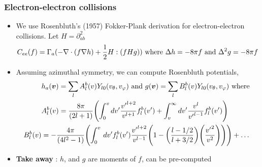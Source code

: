 \documentclass[mathserif, aspectratio=169]{beamer}
\newcommand{\vect}[1]{\boldsymbol{#1}}
\newcommand{\of}[1]{\mleft( #1 \mright)}
\newcommand{\diff}[1]{\, d#1}
\newcommand{\vtheta}{{v_{\theta}}}
\newcommand{\vphi}{v_{\varphi}}
\begin{document}
\begin{frame}
	\frametitle{Electron-electron collisions}
	\begin{itemize}
		\item We use Rosenbluth's (1957) Fokker-Plank derivation for electron-electron collisions. Let $H=\partial^2_{ab}$
		\begin{align}
			C_{ee}(f) &= \Gamma_a(-\nabla \cdot (f \nabla h ) + \frac{1}{2} H : \of{f H g}) \text{ where } \Delta h  = -8\pi f \text{ and } \Delta^2 g =-8\pi f	
		\end{align}
		\item Assuming azimuthal symmetry, we can compute Rosenbluth potentials, 
		\begin{align}
			& h_a\of{\vect{v}} = \sum_{l} A^{b}_l\of{v} Y_{l0}\of{\vtheta, \vphi}  \text{ and } g\of{\vect{v}} = \sum_{l} B^{b}_l\of{v} Y_{l0}\of{\vtheta, \vphi}\text{ where } \\
			\tiny
			& A^{b}_l\of{v} = \frac{8\pi}{(2l+1)}\of{\int_{0}^{v} dv^\prime \frac{{v^\prime}^{l+2}}{v^{l+1}} f^{b}_l\of{v^\prime} +  \int_{v}^{\infty} dv^\prime \frac{{v}^{l}}{{v^\prime}^{l-1}} f^{b}_l\of{v^\prime}}\\
			\tiny
			B^{b}_{l}\of{v} & = -\frac{4\pi}{(4l^2-1)} \of
			{
				\int_{0}^{v} \diff{v^\prime} f^{b}_l\of{v^\prime} \frac{{v^\prime}^{l+2}}{v^{l-1}} \of{1 - \of{\frac{l-1/2}{l+3/2}}\of{\frac{{v^\prime}^2 }{v^2}}} } + \hdots%
		\end{align}
		\item \textbf{Take away} : $h$, and $g$ are moments of $f$, can be pre-computed
	\end{itemize}
\end{frame}
\end{document}
